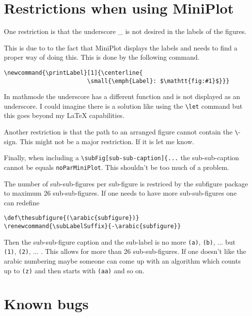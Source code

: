 \documentclass[12pt,a4paper]{article}
\newcommand{\comm}[1]{\texttt{#1}}
\begin{document}
\section{Restrictions when using MiniPlot}

One restriction is that the underscore \_ is not desired in the
labels of the figures. 

This is due to to the fact that MiniPlot displays
the labels and needs to find a proper way of doing this. This is done by the following 
command.

\begin{verbatim}
\newcommand{\printLabel}[1]{\centerline{
                        \small{\emph{Label}: $\mathtt{fig:#1}$}}}
\end{verbatim}


In mathmode the underscore has a different function and is not displayed as an underscore. 
I could imagine there is a solution like using the \verb+\let+ command
but this goes beyond my \LaTeX \hspace{0mm} capabilities.

Another restriction is that the path to an arranged figure cannot contain the \verb+\+-sign. 
This might not be a major restriction. If it is let me know.

Finally, when including a \verb+\subFig[sub-sub-caption]{...+ the sub-sub-caption cannot 
be equals \comm{noParMiniPlot}. This shouldn't be too much of a problem.

The number of sub-sub-figures per sub-figure is restriced by the subfigure package to maximum 
26 sub-sub-figures. If one needs to have more sub-sub-figures one can redefine

\begin{verbatim}
\def\thesubfigure{(\arabic{subfigure})}
\renewcommand{\subLabelSuffix}{-\arabic{subfigure}}
\end{verbatim}

Then the sub-sub-figure caption and the sub-label is no more \comm{(a)}, \comm{(b)}, ... but \comm{(1)}, \comm{(2)}, ... .
This allows for more than 26 sub-sub-figures. If one doesn't like the arabic numbering maybe
someone can come up with an algorithm which counts up to \comm{(z)} and then starts with \comm{(aa)} and so on.



\section{Known bugs}
\end{document}
